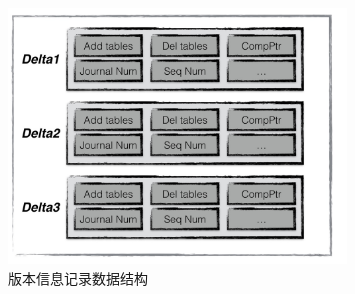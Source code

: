 		\begin{figure}[H]
			\centering
			\includegraphics[width=0.80\textwidth]{images/manifest}
			\caption{版本信息记录数据结构}
			\label{radds_storage_manifest}
		\end{figure}

	
	
